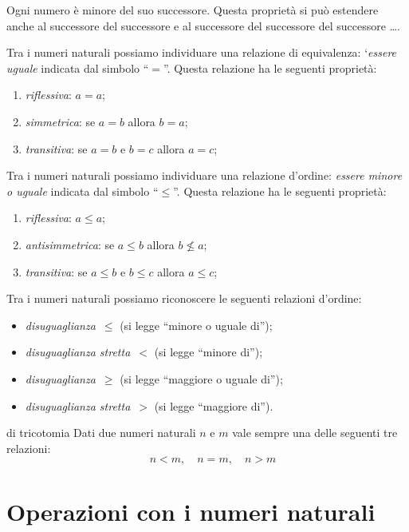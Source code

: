 Ogni numero è minore del suo successore.
Questa proprietà si può estendere anche al successore del successore e 
al successore del successore del successore \dots. 

Tra i numeri naturali possiamo individuare una relazione di equivalenza: 
`\emph{essere uguale} indicata dal simbolo ``\(=\)''. 
Questa relazione ha le seguenti proprietà:
\begin{enumerate} [nosep]
\item \emph{riflessiva}: \(a = a\);
\item \emph{simmetrica}: se \(a = b\) allora \(b = a\);
\item \emph{transitiva}: se \(a = b\) e \(b = c\) allora \(a = c\);
\end{enumerate}

\bigskip
Tra i numeri naturali possiamo individuare una relazione d'ordine: 
\emph{essere minore o uguale} indicata dal simbolo ``\(\leqslant\)''. 
Questa relazione ha le seguenti proprietà:
\begin{enumerate} [nosep]
\item \emph{riflessiva}: \(a \leqslant a\);
\item \emph{antisimmetrica}: se \(a \leqslant b\) allora \(b \nleqslant a\);
\item \emph{transitiva}: se \(a \leqslant b\) e \(b \leqslant c\) 
allora \(a \leqslant c\);
\end{enumerate}

\bigskip
Tra i numeri naturali possiamo riconoscere le seguenti relazioni 
d'ordine: \begin{itemize} [nosep]
\item \emph{disuguaglianza}~\(\leqslant\) (si legge ``minore o uguale di'');
\item \emph{disuguaglianza stretta}~\(<\) (si legge ``minore di'');
\item \emph{disuguaglianza}~\(\geqslant\) (si legge ``maggiore o uguale di'');
\item \emph{disuguaglianza stretta}~\(>\) (si legge ``maggiore di'').
\end{itemize}

\begin{principio}{di tricotomia}{}
Dati due numeri naturali \(n\) e \(m\) vale sempre una delle seguenti tre 
relazioni: 
\[\quad n < m,\quad n = m, \quad n > m\]
\end{principio}

\section{Operazioni con i numeri naturali}
\label{sec:nat_operazioni}

